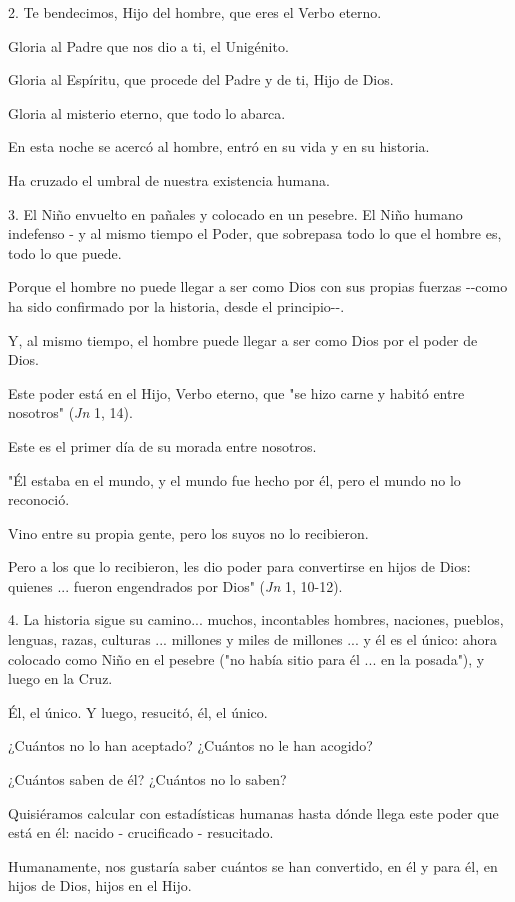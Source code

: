 \begin{body}
\begin{body}
2. Te bendecimos, Hijo del hombre, que eres el Verbo eterno.

Gloria al Padre que nos dio a ti, el Unigénito.

Gloria al Espíritu, que procede del Padre y de ti, Hijo de Dios.

Gloria al misterio eterno, que todo lo abarca.

En esta noche se acercó al hombre, entró en su vida y en su historia.

Ha cruzado el umbral de nuestra existencia humana.

3. El Niño envuelto en pañales y colocado en un pesebre. El Niño humano indefenso - y al mismo tiempo el Poder, que sobrepasa todo lo que el hombre es, todo lo que puede.

Porque el hombre no puede llegar a ser como Dios con sus propias fuerzas -\/-como ha sido confirmado por la historia, desde el principio-\/-.

Y, al mismo tiempo, el hombre puede llegar a ser como Dios por el poder de Dios.

Este poder está en el Hijo, Verbo eterno, que "se hizo carne y habitó entre nosotros" (\emph{Jn} 1, 14).

Este es el primer día de su morada entre nosotros.

"Él estaba en el mundo, y el mundo fue hecho por él, pero el mundo no lo reconoció.

Vino entre su propia gente, pero los suyos no lo recibieron.

Pero a los que lo recibieron, les dio poder para convertirse en hijos de Dios: quienes ... fueron engendrados por Dios" (\emph{Jn} 1, 10-12).

4. La historia sigue su camino... muchos, incontables hombres, naciones, pueblos, lenguas, razas, culturas ... millones y miles de millones ... y él es el único: ahora colocado como Niño en el pesebre ("no había sitio para él ... en la posada"), y luego en la Cruz.

Él, el único. Y luego, resucitó, él, el único.

¿Cuántos no lo han aceptado? ¿Cuántos no le han acogido?

¿Cuántos saben de él? ¿Cuántos no lo saben?

Quisiéramos calcular con estadísticas humanas hasta dónde llega este poder que está en él: nacido - crucificado - resucitado.

Humanamente, nos gustaría saber cuántos se han convertido, en él y para él, en hijos de Dios, hijos en el Hijo.


\end{body}
\end{body}
